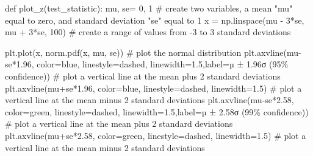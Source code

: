 \documentclass[
  letterpaper,
  DIV=11,
  numbers=noendperiod]{scrreprt}
\newenvironment{Shaded}{\begin{snugshade}}{\end{snugshade}}
\newcommand{\CommentTok}[1]{\textcolor[rgb]{0.37,0.37,0.37}{#1}}
\newcommand{\DecValTok}[1]{\textcolor[rgb]{0.68,0.00,0.00}{#1}}
\newcommand{\FloatTok}[1]{\textcolor[rgb]{0.68,0.00,0.00}{#1}}
\newcommand{\KeywordTok}[1]{\textcolor[rgb]{0.00,0.23,0.31}{#1}}
\newcommand{\NormalTok}[1]{\textcolor[rgb]{0.00,0.23,0.31}{#1}}
\newcommand{\OperatorTok}[1]{\textcolor[rgb]{0.37,0.37,0.37}{#1}}
\newcommand{\SpecialCharTok}[1]{\textcolor[rgb]{0.37,0.37,0.37}{#1}}
\newcommand{\StringTok}[1]{\textcolor[rgb]{0.13,0.47,0.30}{#1}}
\begin{document}
\begin{Shaded}
\begin{Highlighting}[]
\KeywordTok{def}\NormalTok{ plot\_z(test\_statistic):}
\NormalTok{    mu, se}\OperatorTok{=} \DecValTok{0}\NormalTok{, }\DecValTok{1} \CommentTok{\# create two variables, a mean "mu" equal to zero, and standard deviation "se" equal to 1}
\NormalTok{    x }\OperatorTok{=}\NormalTok{ np.linspace(mu }\OperatorTok{{-}} \DecValTok{3}\OperatorTok{*}\NormalTok{se, mu }\OperatorTok{+} \DecValTok{3}\OperatorTok{*}\NormalTok{se, }\DecValTok{100}\NormalTok{) }\CommentTok{\# create a range of values from {-}3 to 3 standard deviations}

\NormalTok{    plt.plot(x, norm.pdf(x, mu, se)) }\CommentTok{\# plot the normal distribution}
\NormalTok{    plt.axvline(mu}\OperatorTok{{-}}\NormalTok{se}\OperatorTok{*}\FloatTok{1.96}\NormalTok{, color}\OperatorTok{=}\StringTok{\textquotesingle{}blue\textquotesingle{}}\NormalTok{, linestyle}\OperatorTok{=}\StringTok{\textquotesingle{}dashed\textquotesingle{}}\NormalTok{, linewidth}\OperatorTok{=}\FloatTok{1.5}\NormalTok{,label}\OperatorTok{=}\StringTok{\textquotesingle{}µ ± 1.96σ (95}\SpecialCharTok{\% c}\StringTok{onfidence)\textquotesingle{}}\NormalTok{) }\CommentTok{\# plot a vertical line at the mean plus 2 standard deviations}
\NormalTok{    plt.axvline(mu}\OperatorTok{+}\NormalTok{se}\OperatorTok{*}\FloatTok{1.96}\NormalTok{, color}\OperatorTok{=}\StringTok{\textquotesingle{}blue\textquotesingle{}}\NormalTok{, linestyle}\OperatorTok{=}\StringTok{\textquotesingle{}dashed\textquotesingle{}}\NormalTok{, linewidth}\OperatorTok{=}\FloatTok{1.5}\NormalTok{)  }\CommentTok{\# plot a vertical line at the mean minus 2 standard deviations}
\NormalTok{    plt.axvline(mu}\OperatorTok{{-}}\NormalTok{se}\OperatorTok{*}\FloatTok{2.58}\NormalTok{, color}\OperatorTok{=}\StringTok{\textquotesingle{}green\textquotesingle{}}\NormalTok{, linestyle}\OperatorTok{=}\StringTok{\textquotesingle{}dashed\textquotesingle{}}\NormalTok{, linewidth}\OperatorTok{=}\FloatTok{1.5}\NormalTok{,label}\OperatorTok{=}\StringTok{\textquotesingle{}µ ± 2.58σ (99}\SpecialCharTok{\% c}\StringTok{onfidence)\textquotesingle{}}\NormalTok{) }\CommentTok{\# plot a vertical line at the mean plus 2 standard deviations}
\NormalTok{    plt.axvline(mu}\OperatorTok{+}\NormalTok{se}\OperatorTok{*}\FloatTok{2.58}\NormalTok{, color}\OperatorTok{=}\StringTok{\textquotesingle{}green\textquotesingle{}}\NormalTok{, linestyle}\OperatorTok{=}\StringTok{\textquotesingle{}dashed\textquotesingle{}}\NormalTok{, linewidth}\OperatorTok{=}\FloatTok{1.5}\NormalTok{)  }\CommentTok{\# plot a vertical line at the mean minus 2 standard deviations}
    

\end{Highlighting}
\end{Shaded}
\end{document}
